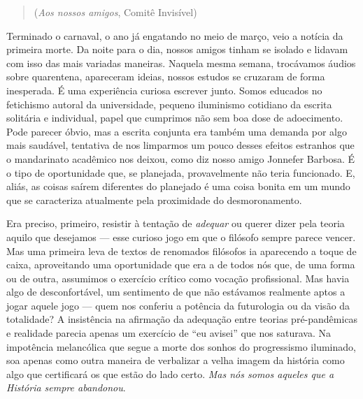 \begin{quote}
(\emph{Aos nossos amigos}, Comitê Invisível)
\end{quote}

Terminado o carnaval, o ano já engatando no meio de março, veio a
notícia da primeira morte. Da noite para o dia, nossos amigos tinham se
isolado e lidavam com isso das mais variadas maneiras. Naquela mesma
semana, trocávamos áudios sobre quarentena, apareceram ideias, nossos
estudos se cruzaram de forma inesperada. É uma experiência curiosa
escrever junto. Somos educados no fetichismo autoral da universidade,
pequeno iluminismo cotidiano da escrita solitária e individual, papel
que cumprimos não sem boa dose de adoecimento. Pode parecer óbvio, mas a
escrita conjunta era também uma demanda por algo mais saudável,
tentativa de nos limparmos um pouco desses efeitos estranhos que o
mandarinato acadêmico nos deixou, como diz nosso amigo Jonnefer Barbosa.
É o tipo de oportunidade que, se planejada, provavelmente não teria
funcionado. E, aliás, as coisas saírem diferentes do planejado é uma
coisa bonita em um mundo que se caracteriza atualmente pela proximidade
do desmoronamento.~

Era preciso, primeiro, resistir à tentação de \emph{adequar} ou querer
dizer pela teoria aquilo que desejamos --- esse curioso jogo em que o
filósofo sempre parece vencer. Mas uma primeira leva de textos de
renomados filósofos ia aparecendo a toque de caixa, aproveitando uma
oportunidade que era a de todos nós que, de uma forma ou de outra,
assumimos o exercício crítico como vocação profissional. Mas havia algo
de desconfortável, um sentimento de que não estávamos realmente aptos a
jogar aquele jogo --- quem nos conferiu a potência da futurologia ou da
visão da totalidade? A insistência na afirmação da adequação entre
teorias pré-pandêmicas e realidade parecia apenas um exercício de ``eu
avisei'' que nos saturava. Na impotência melancólica que segue a morte
dos sonhos do progressismo iluminado, soa apenas como outra maneira de
verbalizar a velha imagem da história como algo que certificará os que
estão do lado certo. \emph{Mas nós somos aqueles que a História sempre
abandonou}.

